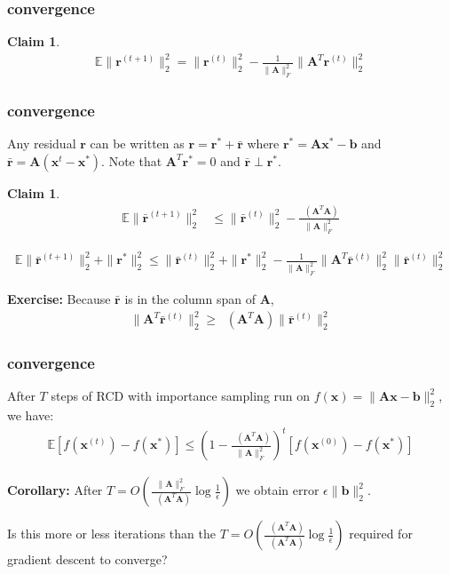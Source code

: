 \documentclass[compress]{beamer}
\newcommand{\bv}[1]{\mathbf{#1}}
\newcommand{\E}{\mathbb{E}}
\DeclareMathOperator*{\lmin}{\lambda_{min}}
\DeclareMathOperator*{\lmax}{\lambda_{max}}
\newtheorem{claim}[theorem]{Claim}
\begin{document}
\begin{frame}[t]
	\frametitle{convergence}
	\begin{claim}
		\begin{align*}
			\E \|\bv{r}^{(t+1)}\|_2^2 = \|\bv{r}^{(t)}\|_2^2 - \frac{1}{\|\bv{A}\|_F^2} \|\bv{A}^T\bv{r}^{(t)}\|_2^2
		\end{align*}
	\end{claim}
\end{frame}

\begin{frame}[t]
	\frametitle{convergence}
	Any residual $\bv{r}$ can be written as $\bv{r} = \bv{r}^* + \bar{\bv{r}}$ where $\bv{r}^*  = \bv{A}\bv{x}^* - \bv{b}$ and  $\bar{\bv{r}} = \bv{A}(\bv{x}^{t} - \bv{x}^*)$. Note that $\bv{A}^T\bv{r}^* = 0$ and $\bar{\bv{r}} \perp \bv{r}^*$.
	\begin{claim}
		\begin{align*}
		\E \|\bar{\bv{r}}^{(t+1)}\|_2^2 
		& \leq \|\bar{\bv{r}}^{(t)}\|_2^2 - \frac{\lmin(\bv{A}^T\bv{A})}{\|\bv{A}\|_F^2} 
		\end{align*}
	\end{claim}

		\begin{align*}
		\E \|\bar{\bv{r}}^{(t+1)}\|_2^2 + \|\bv{r}^*\|_2^2 \leq \|\bar{\bv{r}}^{(t)}\|_2^2 + \|\bv{r}^*\|_2^2 - \frac{1}{\|\bv{A}\|_F^2} \|\bv{A}^T\bar{\bv{r}}^{(t)}\|_2^2  \|\bar{\bv{r}}^{(t)}\|_2^2
		\end{align*}
	
	\textbf{Exercise:} Because $\bar{\bv{r}}$ is in the column span of $\bv{A}$,
		\begin{align*}
		 \|\bv{A}^T\bar{\bv{r}}^{(t)}\|_2^2 \geq \lmin(\bv{A}^T\bv{A})\|\bar{\bv{r}}^{(t)}\|_2^2
		\end{align*}
\end{frame}

\begin{frame}[t]
	\frametitle{convergence}
		\begin{theorem}
			After $T$ steps of RCD with importance sampling run on $f(\bv{x}) = \|\bv{A}\bv{x} - \bv{b}\|_2^2$, we have:
			\begin{align*}
			\E[f(\bv{x}^{(t)}) - f(\bv{x}^*)] \leq\left(1 - \frac{\lmin(\bv{A}^T\bv{A})}{\|\bv{A}\|_F^2}\right)^t [f(\bv{x}^{(0)}) - f(\bv{x}^*)] 
			\end{align*}
		\end{theorem}
		\textbf{Corollary:} After $T = O(\frac{\|\bv{A}\|_F^2}{\lmin(\bv{A}^T\bv{A})}\log\frac{1}{\epsilon})$ we obtain error $\epsilon \|\bv{b}\|_2^2$.
		
		\vspace{5em}
		\alert{Is this more or less iterations than the $T = O(\frac{\lmax(\bv{A}^T\bv{A})}{\lmin(\bv{A}^T\bv{A})}\log\frac{1}{\epsilon})$ required for gradient descent to converge?}
\end{frame}
\end{document}
